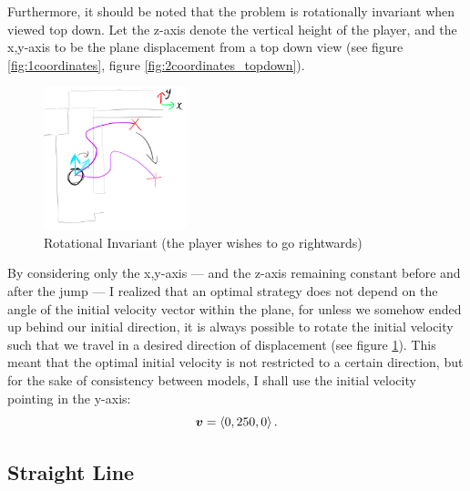 Furthermore, it should be noted that the problem is rotationally invariant when viewed top down. Let the z-axis denote the vertical height of the player, and the x,y-axis to be the plane displacement from a top down view (see figure \ref{fig:1coordinates}, figure \ref{fig:2coordinates_topdown}). \begin{figure}
    \includegraphics[width=0.37\textwidth,right]{assets/2turning.png}
    \caption{Rotational Invariant (the player wishes to go rightwards)}
    \label{fig:2turning}
\end{figure}
By considering only the x,y-axis --- and the z-axis remaining constant before and after the jump --- I realized that an optimal strategy does not depend on the angle of the initial velocity vector within the plane, for unless we somehow ended up behind our initial direction, it is always possible to rotate the initial velocity such that we travel in a desired direction of displacement (see figure \ref{fig:2turning}). This meant that the optimal initial velocity is not restricted to a certain direction, but for the sake of consistency between models, I shall use the initial velocity pointing in the y-axis:
\[
    \boldsymbol{v} = \left\langle 0, 250, 0 \right\rangle.
\]

\subsection{Straight Line}

